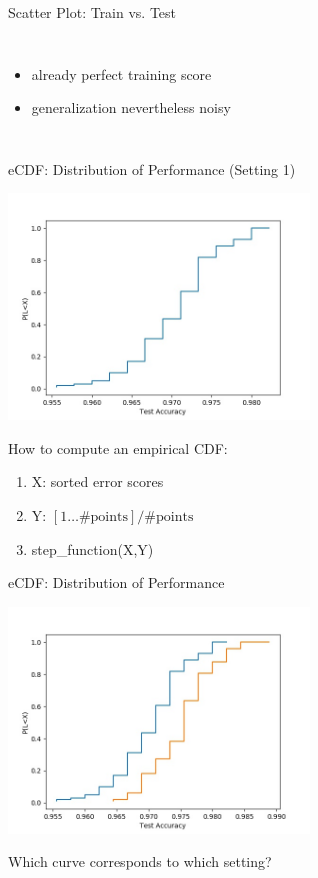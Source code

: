 \begin{frame}[c]{Scatter Plot: Train vs. Test}
\begin{columns}
\begin{itemize}
	\item already perfect training score
	\item generalization nevertheless noisy
\end{itemize}
	
\end{columns}
	
\end{frame}
\begin{frame}[c]{eCDF: Distribution of Performance (Setting 1)}

\centering
\includegraphics[width=0.6\textwidth]{scripts/mlp1_test_ecdf.jpg}

\begin{flushleft}
	How to compute an empirical CDF:
	\begin{enumerate}
		\item X: sorted error scores
		\item Y: $[1\ldots\#\text{points}] / \#\text{points}$
		\item step\_function(X,Y)
	\end{enumerate}
\end{flushleft}


\end{frame}
\begin{frame}[c]{eCDF: Distribution of Performance}

\centering
\includegraphics[width=0.6\textwidth]{scripts/mlp12_test_ecdf.jpg}


Which curve corresponds to which setting? \hands

\end{frame}

